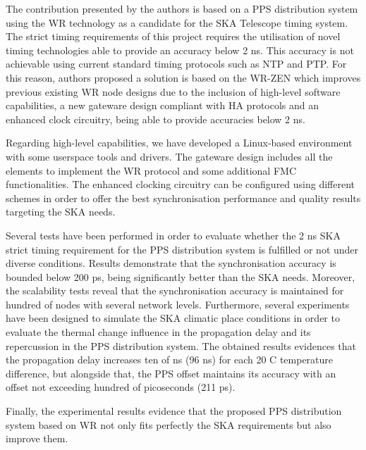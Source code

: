 The contribution presented by the authors is based on a PPS distribution system using the WR technology as a candidate for the SKA Telescope timing system. The strict timing requirements of this project requires the utilisation of novel timing technologies able to provide an accuracy below 2 ns. This accuracy is not achievable using current standard timing protocols such as NTP and PTP.
For this reason, authors proposed a solution is based on the WR-ZEN which improves previous existing WR node designs 
due to the inclusion of high-level software capabilities, a new gateware design compliant with HA protocols and an enhanced clock circuitry, being able to provide accuracies below 2 ns.

Regarding high-level capabilities, we have developed a Linux-based environment with some userspace tools and drivers. The gateware design includes all the elements to implement the WR protocol and some additional FMC functionalities. The enhanced clocking circuitry can be configured using different schemes in order to offer the best synchronisation performance and quality results targeting the SKA needs. 

Several tests have been performed in order to evaluate whether the 2 ns SKA strict timing requirement for the PPS distribution system is fulfilled or not under diverse conditions.
Results demonstrate that the synchronisation accuracy is bounded below 200 ps, being significantly better than the SKA needs. Moreover, the scalability tests reveal that the synchronisation accuracy is maintained for hundred of nodes with several network levels. 
Furthermore, several experiments have been designed to simulate the SKA climatic place conditions 
in order to evaluate the thermal change influence in the propagation delay 
and its repercussion in the PPS distribution system. The obtained results evidences that the propagation delay increases ten of ns (96 ns) for each 20 C temperature difference, but alongside that, the PPS offset maintains its accuracy with an offset not exceeding hundred of picoseconds (211 ps). 

Finally, the experimental results evidence that the proposed PPS distribution system based on WR not only fits perfectly the SKA requirements but also improve them.


